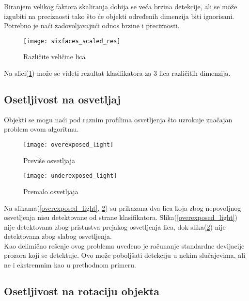 Biranjem velikog faktora skaliranja dobija se veća brzina detekcije, ali se može
izgubiti na preciznosti tako što će objekti određenih dimenzija biti ignorisani. \\
Potrebno je naći zadovoljavajući odnos brzine i preciznosti. \\

\begin{figure}[H]
  \centering
  \texttt{[image: sixfaces\_scaled\_res]}
  \caption{Različite veličine lica}
  \label{sixfaces_scaled}
\end{figure}

Na slici(\ref{sixfaces_scaled}) može se videti rezultat klasifikatora za 3 lica
različitih dimenzija. \\

\newpage

\subsection{Osetljivost na osvetljaj}\label{lumi_inv_sec}

Objekti se mogu naći pod raznim profilima osvetljenja što uzrokuje značajan problem ovom algoritmu.


\begin{figure}[H]
  \centering
  \parbox{0.4\linewidth}{
    \texttt{[image: overexposed\_light]}
    \caption{Previše osvetljaja\cite{CALTECH_DATASET}}
    \label{overexposed_light}}
  \qquad
  \begin{minipage}{0.4\linewidth}
    \texttt{[image: underexposed\_light]}
    \caption{Premalo osvetljaja\cite{CALTECH_DATASET}}
    \label{underexposed_light}
  \end{minipage}
\end{figure}

Na slikama(\ref{overexposed_light}, \ref{underexposed_light}) su prikazana dva
lica koja zbog nepovoljnog osvetljenja nisu detektovane od strane
klasifikatora.
Slika(\ref{overexposed_light}) nije detektovana zbog pristustva prejakog osvetljenja
lica, dok slika(\ref{underexposed_light}) nije detektovana zbog slabog
osvetljenja.  \\

Kao delimično rešenje ovog problema uvedeno je računanje standardne devijacije
prozora koji se detektuje.
Ovo može poboljšati detekciju u nekim slučajevima, ali ne i ekstremnim kao u
prethodnom primeru.

\subsection{Osetljivost na rotaciju objekta}

